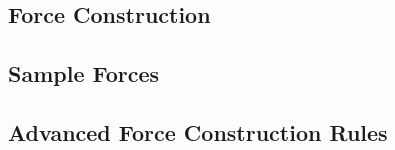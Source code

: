 

\subsection{Force Construction}
\label{subsec:force_construction}



\newpage

\subsection{Sample Forces}
\label{subsec:sample_forces}



\newpage

\subsection{Advanced Force Construction Rules}





\newpage
